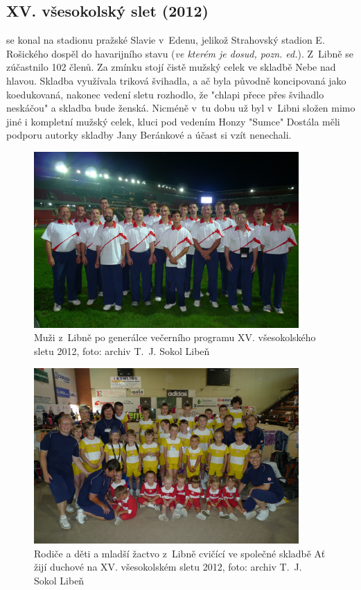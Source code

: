 \documentclass[a5paper, 11pt, twoside]{article}
\begin{document}
\clearpage
\subsection{XV. všesokolský slet (2012)} se konal na stadionu pražské Slavie
v~Edenu, jelikož Strahovský stadion E. Rošického dospěl do havarijního
stavu (\textit{ve kterém je dosud, pozn. ed.}). Z~Libně se zúčastnilo 102
členů. Za zmínku stojí čistě mužský celek ve skladbě Nebe nad hlavou.
Skladba využívala triková švihadla, a ač byla původně koncipovaná jako
koedukovaná, nakonec vedení sletu rozhodlo, že "chlapi přece přes
švihadlo neskáčou" a skladba bude ženská. Nicméně v~tu dobu už byl
v~Libni složen mimo jiné i kompletní mužský celek, kluci pod vedením Honzy
"Sumce" Dostála měli podporu autorky skladby Jany Beránkové a účast si
vzít nenechali.

\begin{figure}[p]
  \centering 
  \includegraphics[width=0.9\textwidth]{img/61_muzi_slet_12.JPG}
  \caption*{Muži z~Libně po generálce večerního programu XV. všesokolského
  sletu 2012, foto: archiv T.~J. Sokol Libeň}
\end{figure}

\begin{figure}[p]
  \centering 
  \includegraphics[width=0.9\textwidth]{img/62_rd_duchove.JPG}
  \caption*{Rodiče a děti a mladší žactvo z~Libně cvičící ve společné skladbě
  Ať žijí duchové na XV. všesokolském sletu 2012, foto: archiv T.~J. Sokol Libeň}
\end{figure}
\end{document}
